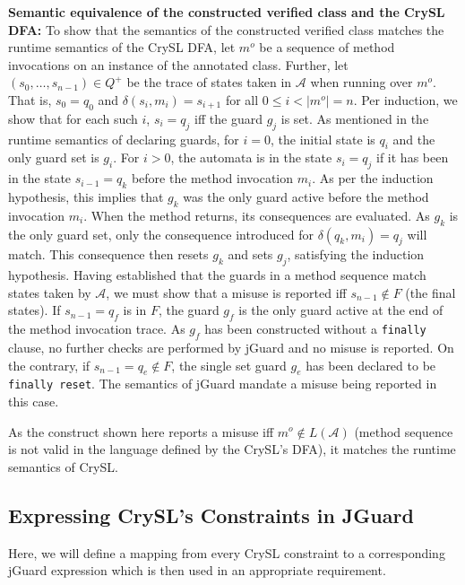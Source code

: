 \documentclass{article}
\begin{document}
\textbf{Semantic equivalence of the constructed verified class and the CrySL DFA: }To show that the semantics of the constructed verified class matches the runtime semantics of the CrySL DFA, 
let $m^o$ be a sequence of method invocations on an instance of the annotated class.
Further, let $(s_0, \ldots, s_{n-1}) \in Q^+$ be the trace of states taken in $\mathcal{A}$
when running over $m^o$. That is, $s_0 = q_0$ and $\delta(s_i, m_i) = s_{i+1}$ for all
$0 \leq i < |m^o| = n$. Per induction, we show that for each such $i$, $s_i = q_j$ iff the guard $g_j$ is set.
As mentioned in the runtime semantics of declaring guards, for $i = 0$, the initial state is $q_i$ and the only guard set is $g_i$.
For $i > 0$, the automata is in the state $s_i = q_j$ if it has been in the state $s_{i-1} = q_k$
before the method invocation $m_i$.
As per the induction hypothesis, this implies that $g_k$ was the only guard active before the
method invocation $m_i$.
When the method returns, its consequences are evaluated. As $g_k$ is the only guard set,
only the consequence introduced for $\delta(q_k, m_i) = q_j$ will match.
This consequence then resets $g_k$ and sets $g_j$, satisfying the induction hypothesis. Having established that the guards in a method sequence match states taken by $\mathcal{A}$,
we must show that a misuse is reported iff $s_{n-1} \not \in F$ (the final states).
If $s_{n-1} = q_f$ is in $F$, the guard $g_f$ is the only guard active at the end of the method
invocation trace. As $g_f$ has been constructed without a \texttt{finally} clause, no further
checks are performed by jGuard and no misuse is reported.
On the contrary, if $s_{n-1} = q_e \not \in F$, the single set guard $g_e$ has been declared
to be \texttt{finally reset}. The semantics of jGuard mandate a misuse being reported in this case.

As the construct shown here reports a misuse iff $m^o \not \in L(\mathcal{A})$ (method sequence is not valid in the language defined by the CrySL's DFA), it matches
the runtime semantics of CrySL.


\subsection{Expressing CrySL's Constraints in JGuard}

Here, we will define a mapping from every CrySL constraint to a corresponding jGuard expression which is then used in an appropriate requirement. 
\end{document}
